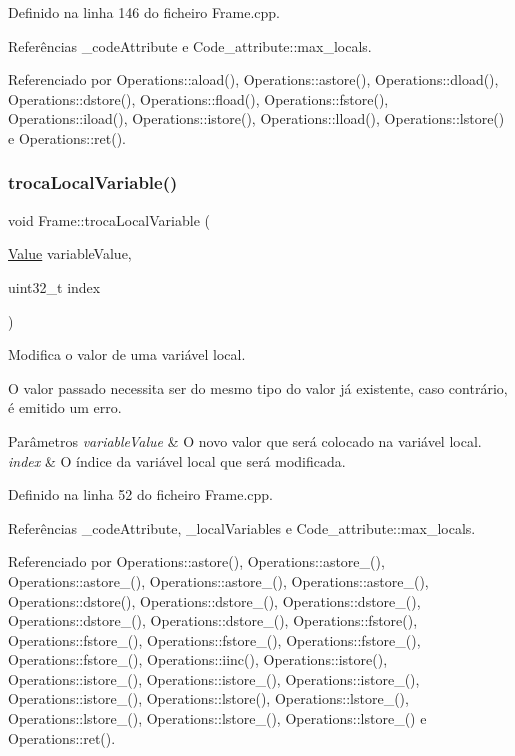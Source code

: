 Definido na linha 146 do ficheiro Frame.\+cpp.



Referências \+\_\+code\+Attribute e Code\+\_\+attribute\+::max\+\_\+locals.



Referenciado por Operations\+::aload(), Operations\+::astore(), Operations\+::dload(), Operations\+::dstore(), Operations\+::fload(), Operations\+::fstore(), Operations\+::iload(), Operations\+::istore(), Operations\+::lload(), Operations\+::lstore() e Operations\+::ret().

\mbox{\label{classFrame_adfa57fa3049213f13beba10ba7152500}} 
\subsubsection{\texorpdfstring{troca\+Local\+Variable()}{trocaLocalVariable()}}
{\footnotesize\ttfamily void Frame\+::troca\+Local\+Variable (\begin{DoxyParamCaption}\item[{\hyperlink{structValue}{Value}}]{variable\+Value,  }\item[{uint32\+\_\+t}]{index }\end{DoxyParamCaption})}



Modifica o valor de uma variável local. 

O valor passado necessita ser do mesmo tipo do valor já existente, caso contrário, é emitido um erro. 
\begin{DoxyParams}{Parâmetros}
{\em variable\+Value} & O novo valor que será colocado na variável local. \\
\hline
{\em index} & O índice da variável local que será modificada. \\
\hline
\end{DoxyParams}


Definido na linha 52 do ficheiro Frame.\+cpp.



Referências \+\_\+code\+Attribute, \+\_\+local\+Variables e Code\+\_\+attribute\+::max\+\_\+locals.



Referenciado por Operations\+::astore(), Operations\+::astore\+\_(), Operations\+::astore\+\_(), Operations\+::astore\+\_(), Operations\+::astore\+\_(), Operations\+::dstore(), Operations\+::dstore\+\_(), Operations\+::dstore\+\_(), Operations\+::dstore\+\_(), Operations\+::dstore\+\_(), Operations\+::fstore(), Operations\+::fstore\+\_(), Operations\+::fstore\+\_(), Operations\+::fstore\+\_(), Operations\+::fstore\+\_(), Operations\+::iinc(), Operations\+::istore(), Operations\+::istore\+\_(), Operations\+::istore\+\_(), Operations\+::istore\+\_(), Operations\+::istore\+\_(), Operations\+::lstore(), Operations\+::lstore\+\_(), Operations\+::lstore\+\_(), Operations\+::lstore\+\_(), Operations\+::lstore\+\_() e Operations\+::ret().



